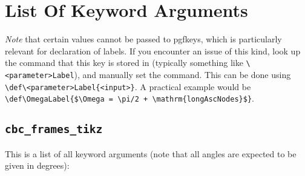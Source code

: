 \documentclass[
    DIV=11,
    BCOR=0mm,
    paper=a4,
    fontsize=11pt,
    twoside=false,
    titlepage=true
]{scrartcl}
\begin{document}
    \section{List Of Keyword Arguments}

\emph{Note} that certain values cannot be passed to pgfkeys, which is
particularly relevant for declaration of labels. If you encounter an issue of
this kind, look up the command that this key is stored in (typically something
like \verb|\<parameter>Label|), and manually set the command. This can be done
using \verb|\def\<parameter>Label{<input>}|. A practical example would be
\verb|\def\OmegaLabel{$\Omega = \pi/2 + \mathrm{longAscNodes}$}|.



        \subsection{\texttt{cbc\_frames\_tikz}}
This is a list of all keyword arguments (note that all angles are expected to
be given in degrees):
\end{document}

